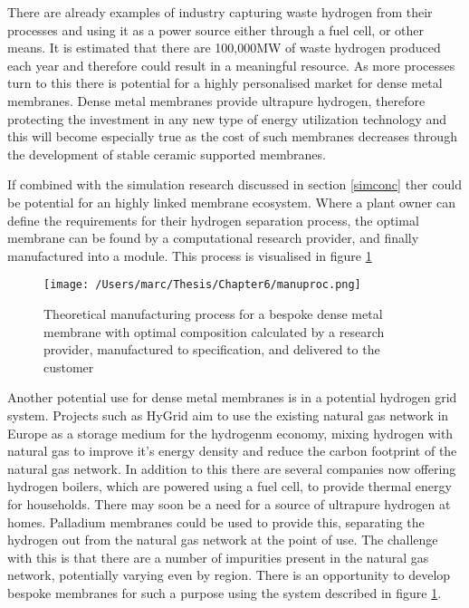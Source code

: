 There are already examples of industry capturing waste hydrogen from their processes and using it as a power source either through a fuel cell, or other means.\cite{doi:10.1177/0144598719839767} It is estimated that there are 100,000MW of waste hydrogen produced each year and therefore could result in a meaningful resource. \cite{cox} As more processes turn to this there is potential for a highly personalised market for dense metal membranes. Dense metal membranes provide ultrapure hydrogen, therefore protecting the investment in any new type of energy utilization technology and this will become especially true as the cost of such membranes decreases through the development of stable ceramic supported membranes.

If combined with the simulation research discussed in section \ref{simconc} ther could be potential for an highly linked membrane ecosystem. Where a plant owner can define the requirements for their hydrogen separation process, the optimal membrane can be found by a computational research provider, and finally manufactured into a module. This process is visualised in figure \ref{manuproc}

\begin{figure}
    \centering
    \texttt{[image: /Users/marc/Thesis/Chapter6/manuproc.png]}
    \caption{Theoretical manufacturing process for a bespoke dense metal membrane with optimal composition calculated by a research provider, manufactured to specification, and delivered to the customer}
    \label{manuproc}
\end{figure}

Another potential use for dense metal membranes is in a potential hydrogen grid system. Projects such as HyGrid \cite{hygrid} aim to use the existing natural gas network in Europe as a storage medium for the hydrogenm economy, mixing hydrogen with natural gas to improve it's energy density and reduce the carbon footprint of the natural gas network. In addition to this there are several companies now offering hydrogen boilers, which are powered using a fuel cell, to provide thermal energy for households.\cite{giacomini} There may soon be a need for a source of ultrapure hydrogen at homes. Palladium membranes could be used to provide this, separating the hydrogen out from the natural gas network at the point of use. The challenge with this is that there are a number of impurities present in the natural gas network, potentially varying even by region. There is an opportunity to develop bespoke membranes for such a purpose using the system described in figure \ref{manuproc}.

